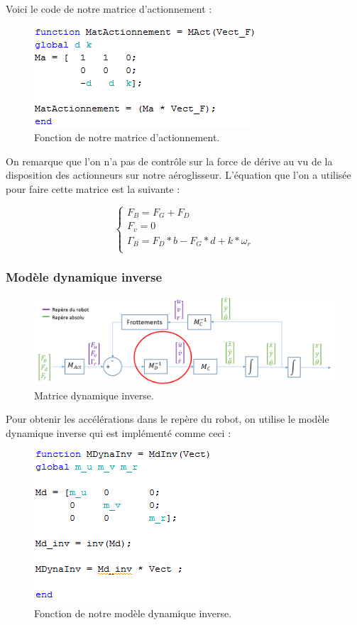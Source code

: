\documentclass[a4paper,10pt]{article}
\begin{document}
Voici le code de notre matrice d’actionnement :
\begin{figure}[H]
\bigcenter\includegraphics[scale=0.8]{images/actionnement.png}
\caption{Fonction de notre matrice d'actionnement.}
\end{figure}

On remarque que l’on n’a pas de contrôle sur la force de dérive au vu de la disposition des actionneurs sur notre aéroglisseur. 
L'équation que l’on a utilisée pour faire cette matrice est la suivante :

\begin{equation}
  \left\{
      \begin{aligned}
        F_B = F_G + F_D\\
        F_v = 0\\
        \Gamma_B = F_D*b - F_G*d + k*\omega_r\\
      \end{aligned}
    \right.
\end{equation}

\subsubsection{Modèle dynamique inverse}
\begin{figure}[H]
\bigcenter\includegraphics[scale=0.5]{images/modeledynamiqueinverse.png}
\caption{Matrice dynamique inverse.}
\end{figure}

Pour obtenir les accélérations dans le repère du robot, on utilise le modèle dynamique inverse qui est implémenté comme ceci :

\begin{figure}[H]
\bigcenter\includegraphics[scale=0.8]{images/dynamique_inverse.png}
\caption{Fonction de notre modèle dynamique inverse.}
\end{figure}
\end{document}
